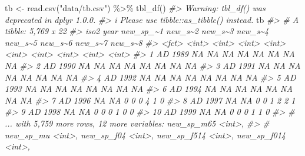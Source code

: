 \documentclass[
]{book}
\newenvironment{Shaded}{\begin{snugshade}}{\end{snugshade}}
\newcommand{\CommentTok}[1]{\textcolor[rgb]{0.56,0.35,0.01}{\textit{#1}}}
\newcommand{\FunctionTok}[1]{\textcolor[rgb]{0.00,0.00,0.00}{#1}}
\newcommand{\NormalTok}[1]{#1}
\newcommand{\OtherTok}[1]{\textcolor[rgb]{0.56,0.35,0.01}{#1}}
\newcommand{\SpecialCharTok}[1]{\textcolor[rgb]{0.00,0.00,0.00}{#1}}
\newcommand{\StringTok}[1]{\textcolor[rgb]{0.31,0.60,0.02}{#1}}
\begin{document}
\begin{Shaded}
\begin{Highlighting}[]
\NormalTok{tb }\OtherTok{\textless{}{-}} \FunctionTok{read.csv}\NormalTok{(}\StringTok{"data/tb.csv"}\NormalTok{) }\SpecialCharTok{\%\textgreater{}\%} \FunctionTok{tbl\_df}\NormalTok{()}
\CommentTok{\#\textgreater{} Warning: \textasciigrave{}tbl\_df()\textasciigrave{} was deprecated in dplyr 1.0.0.}
\CommentTok{\#\textgreater{} i Please use \textasciigrave{}tibble::as\_tibble()\textasciigrave{} instead.}
\NormalTok{tb}
\CommentTok{\#\textgreater{} \# A tibble: 5,769 x 22}
\CommentTok{\#\textgreater{}    iso2   year new\_sp\_\textasciitilde{}1 new\_s\textasciitilde{}2 new\_s\textasciitilde{}3 new\_s\textasciitilde{}4 new\_s\textasciitilde{}5 new\_s\textasciitilde{}6 new\_s\textasciitilde{}7 new\_s\textasciitilde{}8}
\CommentTok{\#\textgreater{}    \textless{}fct\textgreater{} \textless{}int\textgreater{}     \textless{}int\textgreater{}   \textless{}int\textgreater{}   \textless{}int\textgreater{}   \textless{}int\textgreater{}   \textless{}int\textgreater{}   \textless{}int\textgreater{}   \textless{}int\textgreater{}   \textless{}int\textgreater{}}
\CommentTok{\#\textgreater{}  1 AD     1989        NA      NA      NA      NA      NA      NA      NA      NA}
\CommentTok{\#\textgreater{}  2 AD     1990        NA      NA      NA      NA      NA      NA      NA      NA}
\CommentTok{\#\textgreater{}  3 AD     1991        NA      NA      NA      NA      NA      NA      NA      NA}
\CommentTok{\#\textgreater{}  4 AD     1992        NA      NA      NA      NA      NA      NA      NA      NA}
\CommentTok{\#\textgreater{}  5 AD     1993        NA      NA      NA      NA      NA      NA      NA      NA}
\CommentTok{\#\textgreater{}  6 AD     1994        NA      NA      NA      NA      NA      NA      NA      NA}
\CommentTok{\#\textgreater{}  7 AD     1996        NA      NA       0       0       0       4       1       0}
\CommentTok{\#\textgreater{}  8 AD     1997        NA      NA       0       0       1       2       2       1}
\CommentTok{\#\textgreater{}  9 AD     1998        NA      NA       0       0       0       1       0       0}
\CommentTok{\#\textgreater{} 10 AD     1999        NA      NA       0       0       0       1       1       0}
\CommentTok{\#\textgreater{} \# ... with 5,759 more rows, 12 more variables: new\_sp\_m65 \textless{}int\textgreater{},}
\CommentTok{\#\textgreater{} \#   new\_sp\_mu \textless{}int\textgreater{}, new\_sp\_f04 \textless{}int\textgreater{}, new\_sp\_f514 \textless{}int\textgreater{}, new\_sp\_f014 \textless{}int\textgreater{},}

\end{Highlighting}
\end{Shaded}
\end{document}
